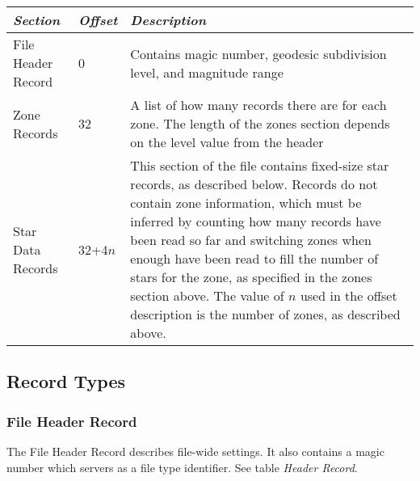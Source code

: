 \begin{longtabu} to \textwidth {l l X}\toprule
\emph{Section} & \emph{Offset} & \emph{Description}\\\midrule
File Header Record &  0        & Contains magic number, geodesic subdivision level, and magnitude range\\\midrule
Zone Records       & 32        & A list of how many records there are for each zone.
                                 The length of the zones section depends on the level value from the header\\\midrule
Star Data Records  & 32+4$n$   & This section of the file contains fixed-size star records, as described below. 
                                 Records do not contain zone information, which must be inferred by counting 
                                 how many records have been read so far and switching zones when enough have been read 
                                 to fill the number of stars for the zone, as specified in the zones section above. 
                                 The value of $n$ used in the offset description is the number of zones, as described above.\\\bottomrule
\end{longtabu}

\subsection{Record Types}%
\label{sec:Catalogues:stars:record:types}

\subsubsection{File Header Record}%
\label{sec:Catalogues:stars:record:header}

The File Header Record describes file-wide settings. It also contains a
magic number which servers as a file type identifier. See table
\emph{Header Record}.

